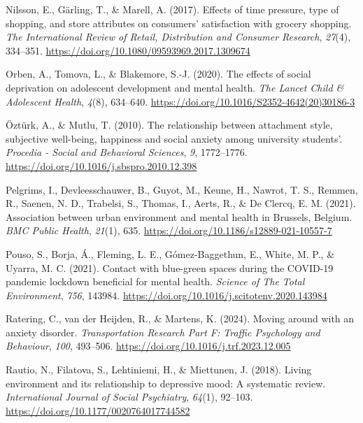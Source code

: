 \documentclass[
  letterpaper,
  number,
  review,
  3p]{elsarticle}
\newlength{\cslhangindent}
\newenvironment{CSLReferences}[2] %
 {\begin{list}{}{%
  \setlength{\itemindent}{0pt}
  \setlength{\leftmargin}{0pt}
  \setlength{\parsep}{0pt}
  \ifodd #1
   \setlength{\leftmargin}{\cslhangindent}
   \setlength{\itemindent}{-1\cslhangindent}
  \fi
  \setlength{\itemsep}{#2\baselineskip}}}
 {\end{list}}
\begin{document}
\begin{CSLReferences}{1}{0}
Nilsson, E., Gärling, T., \& Marell, A. (2017). Effects of time
pressure, type of shopping, and store attributes on consumers'
satisfaction with grocery shopping. \emph{The International Review of
Retail, Distribution and Consumer Research}, \emph{27}(4), 334--351.
\url{https://doi.org/10.1080/09593969.2017.1309674}

Orben, A., Tomova, L., \& Blakemore, S.-J. (2020). The effects of social
deprivation on adolescent development and mental health. \emph{The
Lancet Child \& Adolescent Health}, \emph{4}(8), 634--640.
\url{https://doi.org/10.1016/S2352-4642(20)30186-3}

Öztürk, A., \& Mutlu, T. (2010). The relationship between attachment
style, subjective well-being, happiness and social anxiety among
university students'. \emph{Procedia - Social and Behavioral Sciences},
\emph{9}, 1772--1776. \url{https://doi.org/10.1016/j.sbspro.2010.12.398}

Pelgrims, I., Devleesschauwer, B., Guyot, M., Keune, H., Nawrot, T. S.,
Remmen, R., Saenen, N. D., Trabelsi, S., Thomas, I., Aerts, R., \& De
Clercq, E. M. (2021). Association between urban environment and mental
health in {Brussels}, {Belgium}. \emph{BMC Public Health}, \emph{21}(1),
635. \url{https://doi.org/10.1186/s12889-021-10557-7}

Pouso, S., Borja, Á., Fleming, L. E., Gómez-Baggethun, E., White, M. P.,
\& Uyarra, M. C. (2021). Contact with blue-green spaces during the
{COVID-19} pandemic lockdown beneficial for mental health. \emph{Science
of The Total Environment}, \emph{756}, 143984.
\url{https://doi.org/10.1016/j.scitotenv.2020.143984}

Ratering, C., van der Heijden, R., \& Martens, K. (2024). Moving around
with an anxiety disorder. \emph{Transportation Research Part F: Traffic
Psychology and Behaviour}, \emph{100}, 493--506.
\url{https://doi.org/10.1016/j.trf.2023.12.005}

Rautio, N., Filatova, S., Lehtiniemi, H., \& Miettunen, J. (2018).
Living environment and its relationship to depressive mood: {A}
systematic review. \emph{International Journal of Social Psychiatry},
\emph{64}(1), 92--103. \url{https://doi.org/10.1177/0020764017744582}


\end{CSLReferences}
\end{document}
